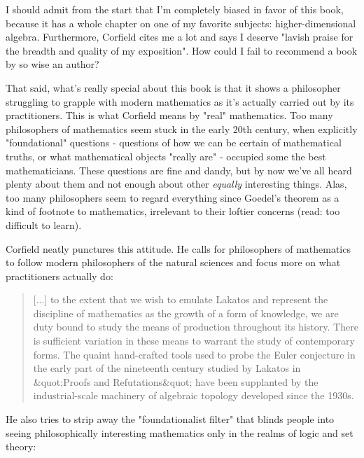 I should admit from the start that I'm completely biased
in favor of this book, because it has a whole chapter 
on one of my favorite subjects: higher-dimensional algebra.
Furthermore, Corfield cites me a lot and says I deserve 
"lavish praise for the breadth and quality of my exposition".  
How could I fail to recommend a book by so wise an author? 

That said, what's really special about this book is that it 
shows a philosopher struggling to grapple with modern mathematics 
as it's actually carried out by its practitioners.  This is what
Corfield means by "real" mathematics.  Too many philosophers of
mathematics seem stuck in the early 20th century, when explicitly 
"foundational" questions - questions of how we can be certain of 
mathematical truths, or what mathematical objects "really are" - 
occupied some the best mathematicians.  These questions are fine 
and dandy, but by now we've all heard plenty about them and not 
enough about other \emph{equally} interesting things.  Alas, too many 
philosophers seem to regard everything since Goedel's theorem as 
a kind of footnote to mathematics, irrelevant to their loftier
concerns (read: too difficult to learn).

Corfield neatly punctures this attitude.  He calls for philosophers 
of mathematics to follow modern philosophers of the natural sciences
and focus more on what practitioners actually do:

\begin{quote}
     [...] to the extent that we wish to emulate Lakatos and 
     represent the discipline of mathematics as the growth of 
     a form of knowledge, we are duty bound to study the means 
     of production throughout its history.  There is sufficient
     variation in these means to warrant the study of contemporary
     forms.  The quaint hand-crafted tools used to probe the 
     Euler conjecture in the early part of the nineteenth century 
     studied by Lakatos in &quot;Proofs and Refutations&quot; have been 
     supplanted by the industrial-scale machinery of algebraic 
     topology developed since the 1930s.  

\end{quote}
    
He also tries to strip away the "foundationalist filter" that 
blinds people into seeing philosophically interesting mathematics
only in the realms of logic and set theory:

